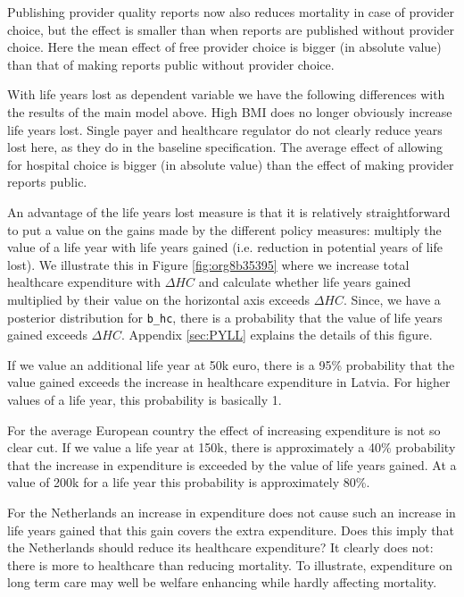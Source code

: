 \documentclass[12pt,english,a4paper]{article}
\begin{document}
Publishing provider quality reports now also reduces mortality in case of provider choice, but the effect is smaller than when reports are published without provider choice. Here the mean effect of free provider choice is bigger (in absolute value) than that of making reports public without provider choice.

With life years lost as dependent variable we have the following differences with the results of the main model above. High BMI does no longer obviously increase life years lost. Single payer and healthcare regulator do not clearly reduce years lost here, as they do in the baseline specification. The average effect of allowing for hospital choice is bigger (in absolute value) than the effect of making provider reports public.

An advantage of the life years lost measure is that it is relatively straightforward to put a value on the gains made by the different policy measures: multiply the value of a life year with life years gained (i.e. reduction in potential years of life lost). We illustrate this in Figure \ref{fig:org8b35395} where we increase total healthcare expenditure with \(\Delta HC\) and calculate whether life years gained multiplied by their value on the horizontal axis exceeds \(\Delta HC\). Since, we have a posterior distribution for \texttt{b\_hc}, there is a probability that the value of life years gained exceeds \(\Delta HC\). Appendix \ref{sec:PYLL} explains the details of this figure.

If we value an additional life year at 50k euro, there is a 95\% probability that the value gained exceeds the increase in healthcare expenditure in Latvia. For higher values of a life year, this probability is basically 1.

For the average European country the effect of increasing expenditure is not so clear cut. If we value a life year at 150k, there is approximately a 40\% probability that the increase in expenditure is exceeded by the value of life years gained. At a value of 200k for a life year this probability is approximately 80\%.

For the Netherlands an increase in expenditure does not cause such an increase in life years gained that this gain covers the extra expenditure. Does this imply that the Netherlands should reduce its healthcare expenditure? It clearly does not: there is more to healthcare than reducing mortality. To illustrate, expenditure on long term care may well be welfare enhancing while hardly affecting mortality.
\end{document}
